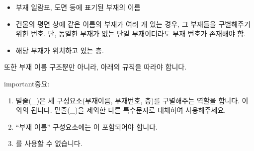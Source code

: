 \documentclass[a4paper,11pt,korean,openany,oneside]{sphinxmanual}
\begin{document}
\begin{figure}[htbp]
\centering
\capstart

\noindent{}
\caption{}\label{\detokenize{2_naming_rules:id4}}\end{figure}
\begin{itemize}
\item {} \begin{description}
\sphinxAtStartPar
부재 일람표, 도면 등에 표기된 부재의 이름

\end{description}

\item {} \begin{description}
\sphinxAtStartPar
건물의 평면 상에 같은 이름의 부재가 여러 개 있는 경우, 그 부재들을 구별해주기 위한 번호.
단, 동일한 부재가 없는 단일 부재이더라도 부재 번호가 존재해야 함.

\end{description}

\item {} \begin{description}
\sphinxAtStartPar
해당 부재가 위치하고 있는 층.

\end{description}

\end{itemize}

\sphinxAtStartPar
또한 부재 이름 구조뿐만 아니라, 아래의 규칙을 따라야 합니다.

\begin{sphinxadmonition}{important}{중요:}\begin{enumerate}
%
\item {} 
\sphinxAtStartPar
밑줄(\_)은 세 구성요소(부재이름, 부재번호, 층)를 구별해주는 역할을 합니다. 이 외의 됩니다.
밑줄(\_)을 제외한 다른 특수문자로 대체하여 사용해주세요.

\item {} 
\sphinxAtStartPar
“부재 이름” 구성요소에는 이 포함되어야 합니다.

\item {} 
\sphinxAtStartPar
{}를 사용할 수 없습니다.

\end{enumerate}
\end{sphinxadmonition}
\end{document}
